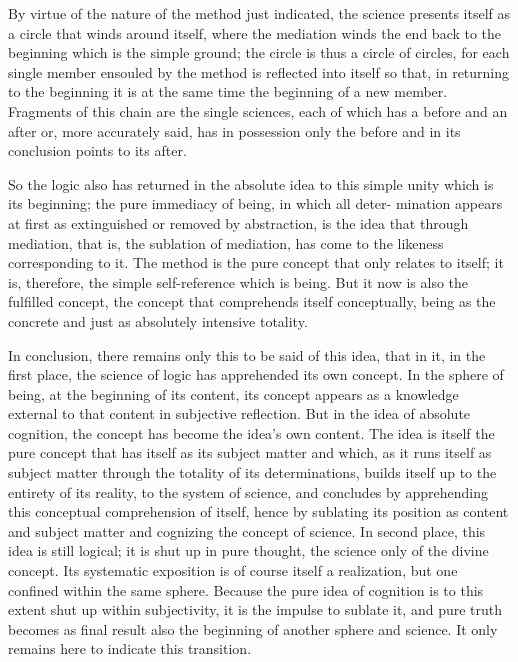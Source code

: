 By virtue of the nature of the method just indicated,
the science presents itself as a circle that winds around itself,
where the mediation winds the end back to the beginning
which is the simple ground;
the circle is thus a circle of circles,
for each single member ensouled by the method
is reflected into itself so that, in returning to the beginning
it is at the same time the beginning of a new member.
Fragments of this chain are the single sciences,
each of which has a before and an after
or, more accurately said, has
in possession only the before
and in its conclusion points to its after.

So the logic also has returned in the absolute idea to this simple unity
which is its beginning; the pure immediacy of being, in which all deter-
mination appears at first as extinguished or removed by abstraction, is the
idea that through mediation, that is, the sublation of mediation, has come
to the likeness corresponding to it. The method is the pure concept that
only relates to itself; it is, therefore, the simple self-reference which is being.
But it now is also the fulfilled concept, the concept that comprehends itself
conceptually, being as the concrete and just as absolutely intensive totality.

In conclusion, there remains only this to be said of this idea, that in it, in
the first place, the science of logic has apprehended its own concept. In the
sphere of being, at the beginning of its content, its concept appears as a
knowledge external to that content in subjective reflection. But in the idea
of absolute cognition, the concept has become the idea's own content. The
idea is itself the pure concept that has itself as its subject matter and which,
as it runs itself as subject matter through the totality of its determinations,
builds itself up to the entirety of its reality, to the system of science, and
concludes by apprehending this conceptual comprehension of itself, hence
by sublating its position as content and subject matter and cognizing the
concept of science.
In second place, this idea is still logical;
it is shut up in pure thought,
the science only of the divine concept.
Its systematic exposition is of course itself a realization,
but one confined within the same sphere.
Because the pure idea of cognition is
to this extent shut up within subjectivity,
it is the impulse to sublate it,
and pure truth becomes as final result
also the beginning of another sphere and science.
It only remains here to indicate this transition.

